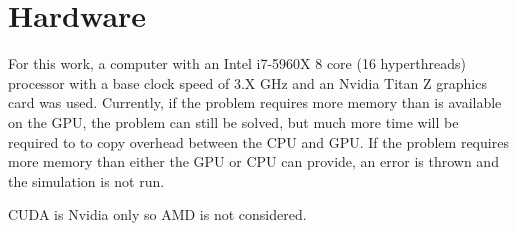 \section{Hardware}
For this work, a computer with an Intel i7-5960X 8 core (16 hyperthreads) processor with a base clock speed of 3.X GHz and an Nvidia Titan Z graphics card was used. Currently, if the problem requires more memory than is available on the GPU, the problem can still be solved, but much more time will be required to to copy overhead between the CPU and GPU. If the problem requires more memory than either the GPU or CPU can provide, an error is thrown and the simulation is not run.

CUDA is Nvidia only so AMD is not considered.

\endinput

